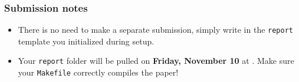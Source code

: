 \documentclass{article}
\begin{document}
\subsubsection*{Submission notes}
\begin{itemize}
\item There is no need to make a separate submission, simply write in the \texttt{report} template you initialized during setup.
\item Your \texttt{report} folder will be pulled on \textbf{Friday, November 10} at . Make sure your \texttt{Makefile} correctly compiles the paper!
\end{itemize}
\end{document}
